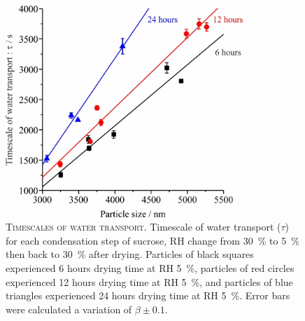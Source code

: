 \begin{figure}
    \centering
    \includegraphics[width=0.8\textwidth]{chapters/water_hopping/figures/image006.jpg}
    \caption[Timescales of water transport]{\textsc{Timescales of water transport}. Timescale of water transport ($\tau$) for each condensation step of sucrose, RH change from \SI{30}{\percent} to \SI{5}{\percent} then back to \SI{30}{\percent} after drying. Particles of black squares experienced \num{6} hours drying time at RH \SI{5}{\percent}, particles of red circles experienced \num{12} hours drying time at RH \SI{5}{\percent}, and particles of blue triangles experienced \num{24} hours drying time at RH \SI{5}{\percent}. Error bars were calculated a variation of $\beta \pm \num{0.1}$.}
    \label{fig:wat_s4}
\end{figure}


